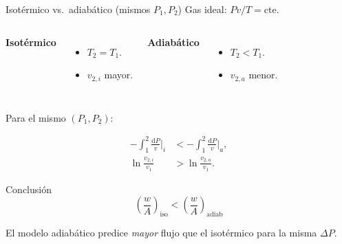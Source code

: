 \documentclass[aspectratio=169]{beamer}
\begin{document}
\begin{frame}{Isotérmico vs.\ adiabático (mismos $P_1,P_2$)}
Gas ideal: $Pv/T = \text{cte}$.

\begin{columns}[T]
\textbf{Isotérmico}
\begin{itemize}
  \item $T_2 = T_1$.
  \item $v_{2,i}$ mayor.
\end{itemize}

\textbf{Adiabático}
\begin{itemize}
  \item $T_2 < T_1$.
  \item $v_{2,a}$ menor.
\end{itemize}
\end{columns}

\medskip
Para el mismo $(P_1,P_2)$:

\begin{align*}
-\int_1^2 \frac{\mathrm dP}{v}\bigg|_i
&<
-\int_1^2 \frac{\mathrm dP}{v}\bigg|_a,\\[4pt]
\ln\frac{v_{2,i}}{v_1}
&>
\ln\frac{v_{2,a}}{v_1}.
\end{align*}

\pause

\begin{block}{Conclusión}
\[
\boxed{
\left(\frac{w}{A}\right)_{\text{iso}}
<
\left(\frac{w}{A}\right)_{\text{adiab}}
}
\]

El modelo adiabático predice \emph{mayor} flujo que el isotérmico para la misma $\Delta P$.
\end{block}
\end{frame}

\end{document}
